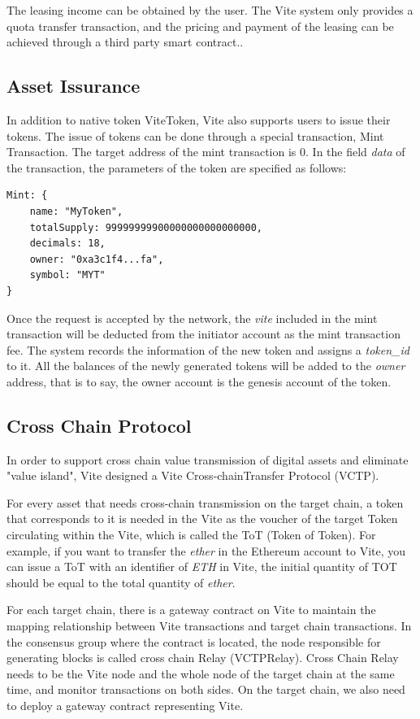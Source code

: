 \documentclass[UTF8,nofonts]{article}
\begin{document}
\begin{multicols}{2}
The leasing income can be obtained by the user. The Vite system only provides a quota transfer transaction, and the pricing and payment of the leasing can be achieved through a third party smart contract..

\subsection{Asset Issurance}
In addition to native token ViteToken, Vite also supports users to issue their tokens. The issue of tokens can be done through a special transaction, Mint Transaction. The target address of the mint transaction is 0. In the field \textit{data} of the transaction, the parameters of the token are specified as follows:

\begin{verbatim}
Mint: {
    name: "MyToken",
   	totalSupply: 99999999900000000000000000,
   	decimals: 18,
   	owner: "0xa3c1f4...fa",
    symbol: "MYT"
}
\end{verbatim}

Once the request is accepted by the network, the \textit{vite} included in the mint transaction will be deducted from the initiator account as the mint transaction fee. The system records the information of the new token and assigns a \textit{token\_id} to it. All the balances of the newly generated tokens will be added to the \textit{owner} address, that is to say, the owner account is the genesis account of the token.

\subsection{Cross Chain Protocol}
In order to support cross chain value transmission of digital assets and eliminate "value island", Vite designed a Vite Cross-chainTransfer Protocol (VCTP).

For every asset that needs cross-chain transmission on the target chain, a token that corresponds to it is needed in the Vite as the voucher of the target Token circulating within the Vite, which is called the ToT (Token of Token). For example, if you want to transfer the \textit{ether} in the Ethereum account to Vite, you can issue a ToT with an identifier of \textit{ETH} in Vite, the initial quantity of TOT should be equal to the total quantity of \textit{ether}.

For each target chain, there is a gateway contract on Vite to maintain the mapping relationship between Vite transactions and target chain transactions. In the consensus group where the contract is located, the node responsible for generating blocks is called cross chain Relay (VCTPRelay). Cross Chain Relay needs to be the Vite node and the whole node of the target chain at the same time, and monitor transactions on both sides. On the target chain, we also need to deploy a gateway contract representing Vite.


\end{multicols}
\end{document}
